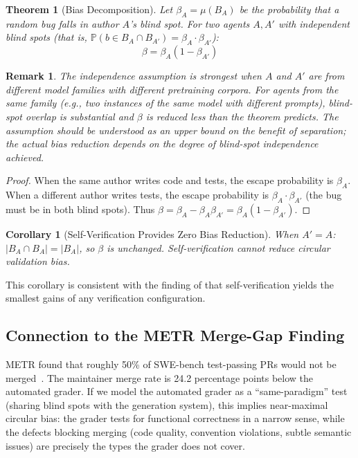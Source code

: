 \documentclass[11pt, a4paper, copyright]{googledeepmind}
\newtheorem{theorem}{Theorem}[section]
\newtheorem{corollary}{Corollary}[section]
\newtheorem*{remark}{Remark}
\newcommand{\Prob}{\mathbb{P}}
\begin{document}
\begin{theorem}[Bias Decomposition]
\label{thm:bias}
Let $\beta_A = \mu(B_A)$ be the probability that a random bug falls in author $A$'s blind spot.
For two agents $A, A'$ with \emph{independent} blind spots (that is, $\Prob(b \in B_A \cap B_{A'}) = \beta_A \cdot \beta_{A'}$):
\begin{equation}
\beta = \beta_A(1 - \beta_{A'})
\end{equation}
\end{theorem}

\begin{remark}
The independence assumption is strongest when $A$ and $A'$ are from different model families with different pretraining corpora.
For agents from the same family (e.g., two instances of the same model with different prompts), blind-spot overlap is substantial and $\beta$ is reduced less than the theorem predicts.
The assumption should be understood as an upper bound on the benefit of separation; the actual bias reduction depends on the degree of blind-spot independence achieved.
\end{remark}

\begin{proof}
When the same author writes code and tests, the escape probability is $\beta_A$.
When a different author writes tests, the escape probability is $\beta_A \cdot \beta_{A'}$ (the bug must be in both blind spots).
Thus $\beta = \beta_A - \beta_A \beta_{A'} = \beta_A(1 - \beta_{A'})$.
\end{proof}

\begin{corollary}[Self-Verification Provides Zero Bias Reduction]
When $A' = A$: $|B_A \cap B_A| = |B_A|$, so $\beta$ is unchanged.
Self-verification cannot reduce circular validation bias.
\end{corollary}

This corollary is consistent with the finding of \citet{selfverification2025} that self-verification yields the smallest gains of any verification configuration.

\subsection{Connection to the METR Merge-Gap Finding}

METR found that roughly 50\% of SWE-bench test-passing PRs would not be merged~\citep{metr2026swebench}.
The maintainer merge rate is 24.2 percentage points below the automated grader.
If we model the automated grader as a ``same-paradigm'' test (sharing blind spots with the generation system), this implies near-maximal circular bias: the grader tests for functional correctness in a narrow sense, while the defects blocking merging (code quality, convention violations, subtle semantic issues) are precisely the types the grader does not cover.
\end{document}
